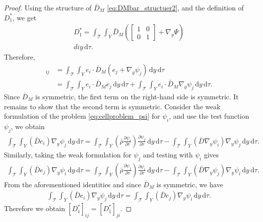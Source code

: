 \documentclass[11pt]{article}
\def\T{\mathcal{T}}
\newcommand{\di}[1]{\,\mathrm{d}#1}
\begin{document}
\begin{proof}
   Using the structure of $\bar D_M$ \eqref{eq:DMbar_structuer2}, and the definition of $D_1^*$, we get
    \begin{align*}
        D_1^*=\int_\T\int_{Y}\bar D_M 
       \left( \begin{bmatrix}
            1&0\\
            0&1
        \end{bmatrix}+\nabla_y\Psi\right)\\di{y}\di{\tau}.
    \end{align*}
    Therefore,
    \begin{align*}
        [D_1^*]_{ij}&=\int_\T\int_{Y}e_i\cdot \bar D_M (e_j+\nabla_y \psi_j)\di{y}\di{\tau}\\
        &=\int_\T\int_{Y}e_i\cdot \bar D_M e_j\di{y}\di{\tau}+\int_\T\int_{Y}e_i\cdot \bar D_M\nabla_y \psi_j\di{y}\di{\tau}.
    \end{align*}
    Since $\bar D_M $ is symmetric, the first term on the right-hand side is symmetric. It remains to show that the second term is symmetric.
    Consider the weak formulation of the problem \eqref{eq:cellproblem_psi} for $\psi_i$, and use the test function $\psi_j$, we obtain
    \begin{align*}
        \int_\T\int_Y\left(\bar De_i\right)\nabla_y\psi_j\di{y}\di{\tau}=\int_\T\int_Y \left(\bar \rho \frac{\partial \psi_i}{\partial \tau}\right)\frac{\partial \psi_j}{\partial \tau}\di{y}\di{\tau}-\int_\T\int_Y\left(\bar D\nabla_y\psi_i\right)\nabla_y\psi_j\di{y}\di{\tau}.
    \end{align*}
    Similarly, taking the weak formulation for $\psi_j$ and testing with $\psi_i$ gives
     \begin{align*}
        \int_\T\int_Y\left(\bar De_j\right)\nabla_y\psi_i\di{y}\di{\tau}=\int_\T\int_Y \left(\bar \rho \frac{\partial \psi_j}{\partial \tau}\right)\frac{\partial \psi_i}{\partial \tau}\di{y}\di{\tau}-\int_\T\int_Y\left(\bar D\nabla_y\psi_j\right)\nabla_y\psi_i\di{y}\di{\tau}.
    \end{align*}
   From the aforementioned identities and since $\bar D_M$ is symmetric, we have
    \begin{align*}
        \int_\T\int_Y\left(\bar De_i\right)\nabla_y\psi_j\di{y}\di{\tau}= \int_\T\int_Y\left(\bar De_j\right)\nabla_y\psi_i\di{y}\di{\tau}.
    \end{align*}
    Therefore we obtain $[D_1^*]_{ij}=[D_1^*]_{ji}$.
\end{proof}
\end{document}
